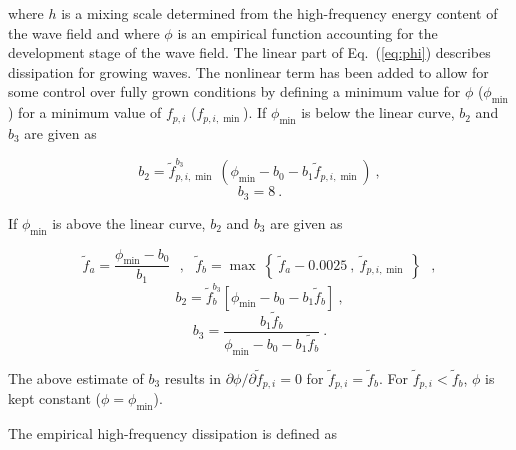 \noindent
where $h$ is a mixing scale determined from the high-frequency energy content
of the wave field and where $\phi$ is an empirical function accounting for the
development stage of the wave field. The linear part of Eq.~(\ref{eq:phi})
describes dissipation for growing waves. The nonlinear term has been added to
allow for some control over fully grown conditions by defining a minimum value
for $\phi$ ($\phi_{\min}$) for a minimum value of $f_{p,i}$
($f_{p,i,\min}$). If $\phi_{\min}$ is below the linear curve, $b_2$ and $b_3$
are given as


\begin{equation}
b_2 = \tilde{f}_{p,i,\min}^{b_3} \: \left ( \phi_{\min} - b_0
- b_1 \tilde{f}_{p,i,\min} \right ) \: , \label{eq:b_21}
\end{equation} \begin{equation}
b_3 = 8 \: . \label{eq:b_31}
\end{equation}

\noindent
If $\phi_{\min}$ is above the linear curve, $b_2$ and $b_3$ are given as


\begin{equation}
\tilde{f}_a = \frac{\phi_{\min} - b_0}{b_1} \:\:\: , \:\:\:
\tilde{f}_b = \max \: \left \{ \: \tilde{f}_a - 0.0025 \: , \:
\tilde{f}_{p,i,\min} \: \right \} \:\:\: , \label{eq:f_a}
\end{equation} \begin{equation}
b_2 = \tilde{f}_b^{b_3} \left [ \phi_{\min} - b_0 -
b_1 \tilde{f}_b \right ] \: , \label{eq:b_22}
\end{equation} \begin{equation}
b_3 = \frac{b_1 \tilde{f}_b}{\phi_{\min} -b_0 -b_1 \tilde{f}_b}
\: . \label{eq:b_32}
\end{equation}

\noindent
The above estimate of $b_3$ results in $\partial \phi / \partial
\tilde{f}_{p,i} = 0$ for $\tilde{f}_{p,i} = \tilde{f}_b$. For $\tilde{f}_{p,i}
< \tilde{f}_b$, $\phi$ is kept constant ($\phi = \phi_{\min}$).

\vspace{\baselineskip} \noindent
The empirical high-frequency dissipation is defined as


